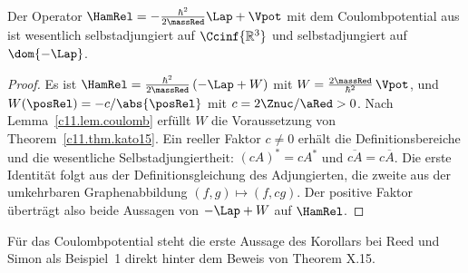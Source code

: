\begin{fundament}
  \begin{corollary}[Relativbewegung]\label{c11.cor.relativ}
    Der Operator $\HamRel = -\frac{\hbar^2}{2\massRed}\Lap + \Vpot$ mit dem
    Coulombpotential aus  ist wesentlich selbstadjungiert auf
    $\Ccinf{\mathbb{R}^3}$ und selbstadjungiert auf $\dom{-\Lap}$.
  \end{corollary}
  \begin{proof}
    Es ist $\HamRel = \frac{\hbar^2}{2\massRed}\,(-\Lap + W)$ mit
    $W = \frac{2\massRed}{\hbar^2}\,\Vpot$, und $W(\posRel) = -c/\abs{\posRel}$ mit
    $c = 2\Znuc/\aRed > 0$. Nach Lemma~\ref{c11.lem.coulomb} erfüllt $W$ die
    Voraussetzung von Theorem~\ref{c11.thm.kato15}. Ein reeller Faktor $c \neq 0$
    erhält die Definitionsbereiche und die wesentliche Selbstadjungiertheit:
    $(cA)^* = cA^*$ und $\overline{cA} = c\overline{A}$. Die erste Identität folgt aus
    der Definitionsgleichung des Adjungierten, die zweite aus der umkehrbaren
    Graphenabbildung $(f,g) \mapsto (f,cg)$. Der positive Faktor überträgt also beide
    Aussagen von $-\Lap + W$ auf $\HamRel$.
  \end{proof}

  Für das Coulombpotential steht die erste Aussage des Korollars bei Reed und Simon als
  Beispiel~1 direkt hinter dem Beweis von Theorem X.15.


\end{fundament}
